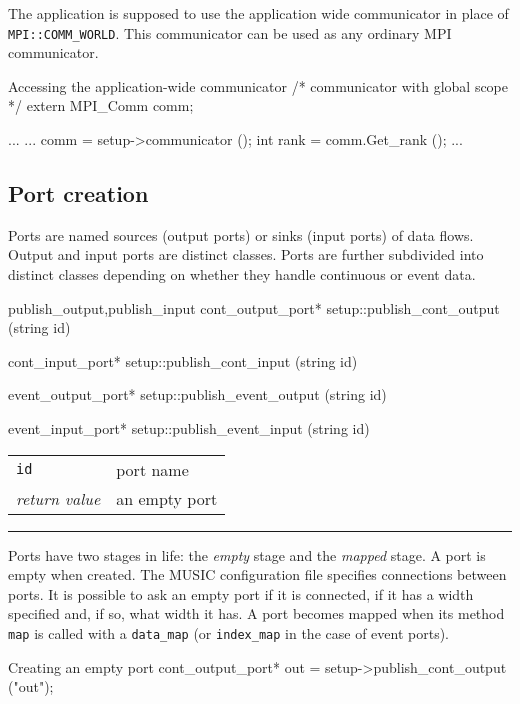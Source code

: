 \documentclass[a4paper]{report}
\makeatletter
\newenvironment{parameters}%
{\begin{tabular}{@{\hspace{2em}}lp{0.6\textwidth}}}%
{\end{tabular}\par\vspace{1mm}\par\hrule\par\vspace{5mm}}
\makeatother
\begin{document}
The application is supposed to use the application wide communicator
in place of
\lstinline|MPI::COMM_WORLD|.
This communicator can be used as any ordinary MPI communicator.

\begin{code}{Accessing the application-wide communicator}
/* communicator with global scope */
extern MPI_Comm comm;

...
{
  ...
  comm = setup->communicator ();
  int rank = comm.Get_rank ();
  ...
}
\end{code}

\subsection{Port creation}

Ports are named sources (output ports) or sinks (input
ports) of data flows.  Output and input ports are distinct classes.
Ports are further subdivided into distinct classes depending on
whether they handle continuous or event data.

\begin{head}{publish_output,publish_input}
  cont_output_port* setup::publish_cont_output (string id)

  cont_input_port* setup::publish_cont_input (string id)

  event_output_port* setup::publish_event_output (string id)

  event_input_port* setup::publish_event_input (string id)
\end{head}
\begin{parameters}
  \lstinline|id| & port name \\
  \emph{return value} & an empty port \\
\end{parameters}

Ports have two stages in life: the \emph{empty} stage and the
\emph{mapped} stage.  A port is empty when created.  The MUSIC
configuration file specifies connections between ports.  It is
possible to ask an empty port if it is connected, if it has a width
specified and, if so, what width it has.  A port becomes mapped when
its method \lstinline|map| is called with a \lstinline|data_map| (or
\lstinline|index_map| in the case of event ports).

\begin{code}{Creating an empty port}
cont_output_port* out = setup->publish_cont_output ("out");
\end{code}
\end{document}
